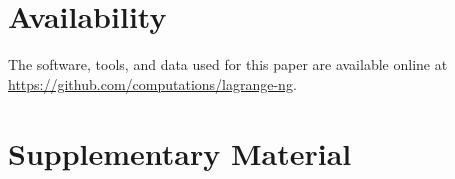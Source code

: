\documentclass[oupdraft]{sysbio}
\begin{document}
\bigskip

\section{Availability}\label{sec:availability}

The software, tools, and data used for this paper are available online at \url{https://github.com/computations/lagrange-ng}.

\section{Supplementary Material}

\bigskip\bigskip



\end{document}
